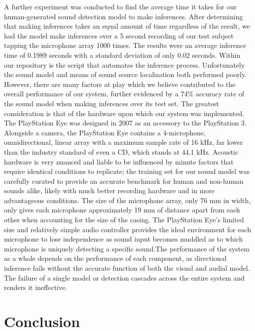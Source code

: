\documentclass{article}
\begin{document}
A further experiment was conducted to find the average time it takes for our human-generated sound detection model to make inferences. After determining that making inferences takes an equal amount of time regardless of the result, we had the model make inferences over a 5 second recording of our test subject tapping the microphone array 1000 times. The results were an average inference time of 0.1989 seconds with a standard deviation of only 0.02 seconds. Within our repository is the script that automates the inference process.
Unfortunately the sound model and means of sound source localization both performed poorly. However, there are many factors at play which we believe contributed to the overall performance of our system, further evidenced by a 74\% accuracy rate of the sound model when making inferences over its test set. The greatest consideration is that of the hardware upon which our system was implemented. The PlayStation Eye was designed in 2007 as an accessory to the PlayStation 3. Alongside a camera, the PlayStation Eye contains a 4-microphone, omnidirectional, linear array with a maximum sample rate of 16 kHz, far lower than the industry standard of even a CD, which stands at 44.1 kHz. Acoustic hardware is very nuanced and liable to be influenced by minute factors that require identical conditions to replicate; the training set for our sound model was carefully curated to provide an accurate benchmark for human and non-human sounds alike, likely with much better recording hardware and in more advantageous conditions. The size of the microphone array, only 76 mm in width, only gives each microphone approximately 19 mm of distance apart from each other when accounting for the size of the casing. The PlayStation Eye’s limited size and relatively simple audio controller provides the ideal environment for each microphone to lose independence as sound input becomes muddled as to which microphone is uniquely detecting a specific sound.The performance of the system as a whole depends on the performance of each component, as directional inference fails without the accurate function of both the visual and audial model. The failure of a single model or detection cascades across the entire system and renders it ineffective.


\section{Conclusion}
\end{document}

